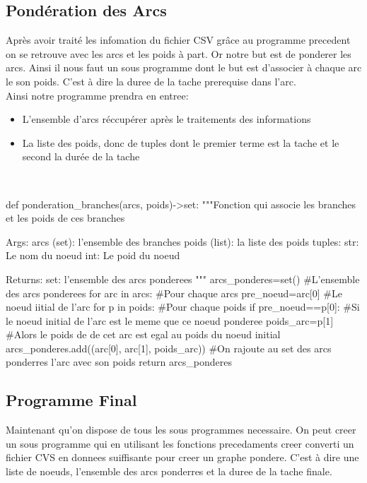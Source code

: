 \documentclass{article}
\begin{document}
\subsection{Pondération des Arcs}
Après avoir traité les infomation du fichier CSV grâce au programme precedent on se retrouve avec les arcs et les poids à part. Or notre but est de ponderer les arcs. Ainsi il nous faut un sous programme dont le but est d'associer à chaque arc le son poids. C'est à dire la duree de la tache prerequise dans l'arc.
\\
Ainsi notre programme prendra en entree:
\begin{itemize}
    \item L'ensemble d'arcs réccupérer après le traitements des informations
    
    \item La liste des poids, donc de tuples dont le premier terme est la tache et le second la durée de la tache
\end{itemize}
\\
\begin{python}
def ponderation_branches(arcs, poids)->set:
    """Fonction qui associe les branches et les poids de ces branches

    Args:
        arcs (set): l'ensemble des branches
        poids (list): la liste des poids
            tuples:
                str: Le nom du noeud
                int: Le poid du noeud
    
    Returns:
        set: l'ensemble des arcs ponderees
    """
    arcs_ponderes=set() #L'ensemble des arcs ponderees
    for arc in arcs: #Pour chaque arcs
        pre_noeud=arc[0] #Le noeud iitial de l'arc
        for p in poids: #Pour chaque poids
            if pre_noeud==p[0]: #Si le noeud initial de l'arc est le meme que ce noeud ponderee
                poids_arc=p[1] #Alors le poids de de cet arc est egal au poids du noeud initial
        arcs_ponderes.add((arc[0], arc[1], poids_arc)) #On rajoute au set des arcs ponderres l'arc avec son poids 
    return arcs_ponderes
\end{python}

\subsection{Programme Final}
Maintenant qu'on dispose de tous les sous programmes necessaire. On peut creer un sous programme qui en utilisant les fonctions precedaments creer converti un fichier CVS en donnees suiffisante pour creer un graphe pondere. C'est à dire une liste de noeuds, l'ensemble des arcs ponderres et la duree de la tache finale. 
\\
\end{document}
